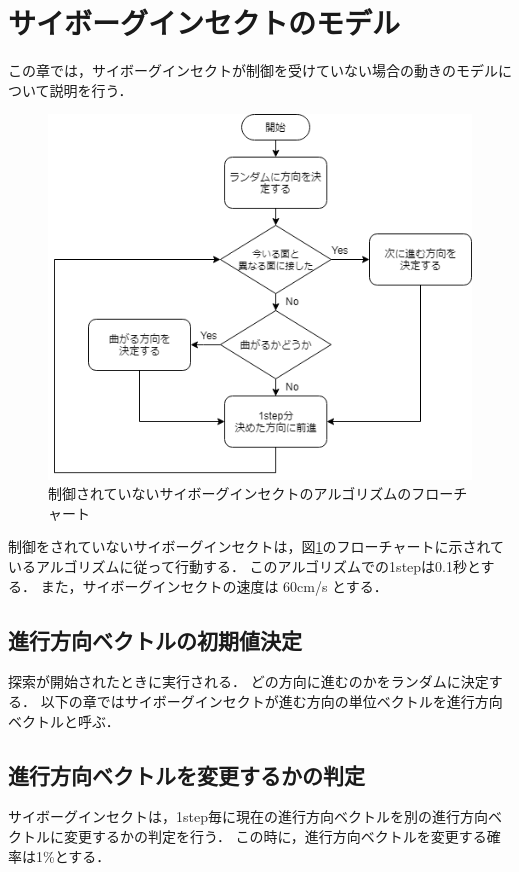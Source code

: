 \documentclass[a4paper,11pt]{jarticle}
\begin{document}
	\section{サイボーグインセクトのモデル}
	\label{sec:algorithm}
	この章では，サイボーグインセクトが制御を受けていない場合の動きのモデルについて説明を行う．
	\begin{figure}
		\centering
		\includegraphics[width=0.7\linewidth]{png/Untitled.png}
		\caption[アルゴリズムのフローチャート]{制御されていないサイボーグインセクトのアルゴリズムのフローチャート}
		\label{fig:algorithm}
	\end{figure}
	
	制御をされていないサイボーグインセクトは，図\ref{fig:algorithm}のフローチャートに示されているアルゴリズムに従って行動する．
	このアルゴリズムでの1stepは0.1秒とする．
	また，サイボーグインセクトの速度は 60cm/s とする\cite{speed}．
	
	\subsection{進行方向ベクトルの初期値決定}
	\label{random}
	探索が開始されたときに実行される．
	どの方向に進むのかをランダムに決定する．
	以下の章ではサイボーグインセクトが進む方向の単位ベクトルを進行方向ベクトルと呼ぶ．
		
	\subsection{進行方向ベクトルを変更するかの判定}
	\label{carb}
	サイボーグインセクトは，1step毎に現在の進行方向ベクトルを別の進行方向ベクトルに変更するかの判定を行う．
	この時に，進行方向ベクトルを変更する確率は1\%とする．
	
\end{document}
